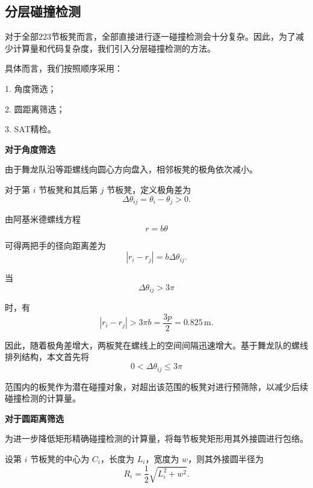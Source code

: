 \subsection{分层碰撞检测}
对于全部$223$节板凳而言，全部直接进行逐一碰撞检测会十分复杂。因此，为了减少计算量和代码复杂度，我们引入分层碰撞检测的方法。

具体而言，我们按照顺序采用：

1. 角度筛选；

2. 圆距离筛选；

3. SAT精检。

\textbf{对于角度筛选}

由于舞龙队沿等距螺线向圆心方向盘入，相邻板凳的极角依次减小。

对于第 \(i\) 节板凳和其后第 \(j\) 节板凳，定义极角差为
\begin{equation*}
\Delta\theta_{ij} = \theta_i - \theta_j > 0.
\end{equation*}

由阿基米德螺线方程
\begin{equation*}
r = b\theta
\end{equation*}

可得两把手的径向距离差为
\begin{equation*}
|r_i - r_j| = b\Delta\theta_{ij}.
\end{equation*}

当
\begin{equation*}
\Delta\theta_{ij} > 3\pi
\end{equation*}

时，有
\begin{equation*}
|r_i - r_j| > 3\pi b = \frac{3p}{2} = 0.825\,\text{m}.
\end{equation*}

因此，随着极角差增大，两板凳在螺线上的空间间隔迅速增大。基于舞龙队的螺线排列结构，本文首先将
\begin{equation*}
0 < \Delta\theta_{ij} \leq 3\pi
\end{equation*}

范围内的板凳作为潜在碰撞对象，对超出该范围的板凳对进行预筛除，以减少后续碰撞检测的计算量。

\textbf{对于圆距离筛选}

为进一步降低矩形精确碰撞检测的计算量，将每节板凳矩形用其外接圆进行包络。

设第 \(i\) 节板凳的中心为 \(C_i\)，长度为 \(L_i\)，宽度为 \(w\)，则其外接圆半径为
\begin{equation*}
R_i = \frac{1}{2}\sqrt{L_i^2 + w^2}.
\end{equation*}

